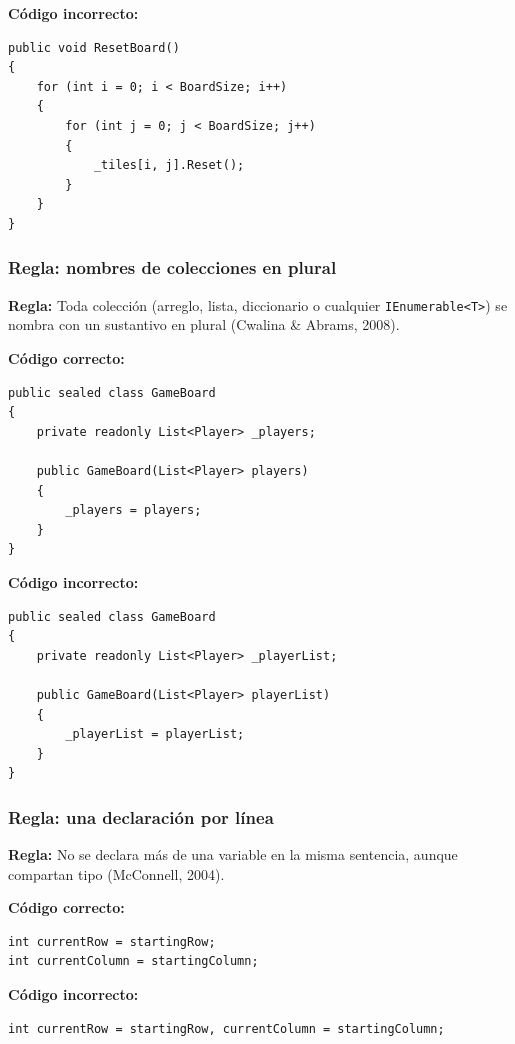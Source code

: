\textbf{Código incorrecto:}
\begin{lstlisting}[style=csharpstyle]
public void ResetBoard()
{
    for (int i = 0; i < BoardSize; i++)
    {
        for (int j = 0; j < BoardSize; j++)
        {
            _tiles[i, j].Reset();
        }
    }
}
\end{lstlisting}

\subsubsection{Regla: nombres de colecciones en plural}

\textbf{Regla:} Toda colección (arreglo, lista, diccionario o cualquier \texttt{IEnumerable<T>}) se nombra con un sustantivo en plural (Cwalina \& Abrams, 2008).

\textbf{Código correcto:}
\begin{lstlisting}[style=csharpstyle]
public sealed class GameBoard
{
    private readonly List<Player> _players;

    public GameBoard(List<Player> players)
    {
        _players = players;
    }
}
\end{lstlisting}

\textbf{Código incorrecto:}
\begin{lstlisting}[style=csharpstyle]
public sealed class GameBoard
{
    private readonly List<Player> _playerList;

    public GameBoard(List<Player> playerList)
    {
        _playerList = playerList;
    }
}
\end{lstlisting}

\subsubsection{Regla: una declaración por línea}

\textbf{Regla:} No se declara más de una variable en la misma sentencia, aunque compartan tipo (McConnell, 2004).

\textbf{Código correcto:}
\begin{lstlisting}[style=csharpstyle]
int currentRow = startingRow;
int currentColumn = startingColumn;
\end{lstlisting}

\textbf{Código incorrecto:}
\begin{lstlisting}[style=csharpstyle]
int currentRow = startingRow, currentColumn = startingColumn;
\end{lstlisting}

